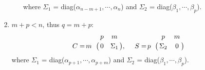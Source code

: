 \begin{enumerate}
\begin{enumerate}
                        where $\Sigma_1$ = diag($\alpha_{n-m+1}, \cdots, \alpha_{n}$) and $\Sigma_2$ = diag($\beta_1, \cdots, \beta_p$).
                \end{enumerate}
            \item $m + p < n$, thus $q = m+p$:
                \begin{displaymath}
                    C = \bordermatrix{ & p & m   \cr
                    \hfill m & 0 & \Sigma_1}, \  \ \ \
                    S = \bordermatrix{ & p & m   \cr
                    \hfill p & \Sigma_2 & 0}
                \end{displaymath}
                where $\Sigma_1$ = diag($\alpha_{p+1}, \cdots, \alpha_{p+m}$) and $\Sigma_2$ = diag($\beta_1, \cdots, \beta_p$).
        \end{enumerate}
        
